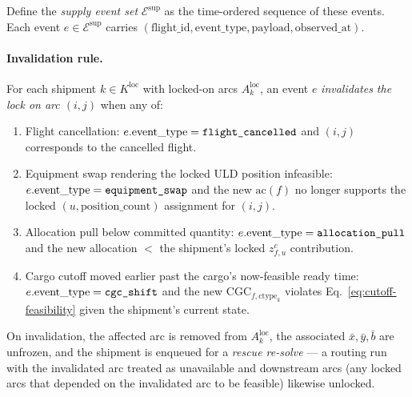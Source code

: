 \documentclass[11pt,a4paper]{article}
\newcommand{\ctype}{\text{ctype}}
\theoremstyle{definition}
\begin{document}
Define the \emph{supply event set} $\mathcal{E}^{\text{sup}}$ as the time-ordered
sequence of these events. Each event $e \in \mathcal{E}^{\text{sup}}$ carries
$(\text{flight\_id}, \text{event\_type}, \text{payload}, \text{observed\_at})$.

\paragraph{Invalidation rule.}
For each shipment $k \in K^{\text{loc}}$ with locked-on arcs $A_k^{\text{loc}}$, an
event $e$ \emph{invalidates the lock on arc $(i,j)$} when any of:
\begin{enumerate}[noitemsep,label=(\alph*)]
  \item Flight cancellation: $e.\text{event\_type} = \text{\texttt{flight\_cancelled}}$
        and $(i,j)$ corresponds to the cancelled flight.
  \item Equipment swap rendering the locked ULD position infeasible:
        $e.\text{event\_type} = \text{\texttt{equipment\_swap}}$ and the new
        $\text{ac}(f)$ no longer supports the locked
        $(u, \text{position\_count})$ assignment for $(i,j)$.
  \item Allocation pull below committed quantity:
        $e.\text{event\_type} = \text{\texttt{allocation\_pull}}$ and the
        new allocation $<$ the shipment's locked $z_{f,u}^c$ contribution.
  \item Cargo cutoff moved earlier past the cargo's now-feasible ready time:
        $e.\text{event\_type} = \text{\texttt{cgc\_shift}}$ and the new
        $\text{CGC}_{f,\ctype_k}$ violates Eq.~\ref{eq:cutoff-feasibility} given the
        shipment's current state.
\end{enumerate}
On invalidation, the affected arc is removed from $A_k^{\text{loc}}$, the associated
$\bar{x}, \bar{y}, \bar{b}$ are unfrozen, and the shipment is enqueued for a
\emph{rescue re-solve} --- a routing run with the invalidated arc treated as
unavailable and downstream arcs (any locked arcs that depended on the invalidated arc
to be feasible) likewise unlocked.
\end{document}

